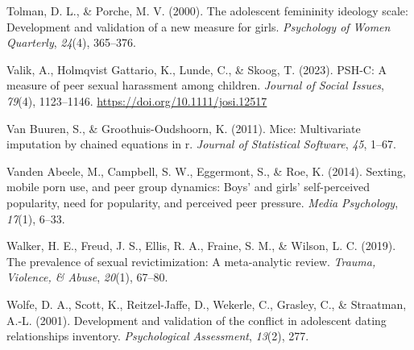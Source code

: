 \documentclass[
]{article}
\newlength{\cslhangindent}
\newenvironment{CSLReferences}[2] %
 {\begin{list}{}{%
  \setlength{\itemindent}{0pt}
  \setlength{\leftmargin}{0pt}
  \setlength{\parsep}{0pt}
  \ifodd #1
   \setlength{\leftmargin}{\cslhangindent}
   \setlength{\itemindent}{-1\cslhangindent}
  \fi
  \setlength{\itemsep}{#2\baselineskip}}}
 {\end{list}}
\begin{document}
\begin{CSLReferences}{1}{0}
Tolman, D. L., \& Porche, M. V. (2000). The adolescent femininity
ideology scale: Development and validation of a new measure for girls.
\emph{Psychology of Women Quarterly}, \emph{24}(4), 365--376.

Valik, A., Holmqvist Gattario, K., Lunde, C., \& Skoog, T. (2023).
PSH-C: A measure of peer sexual harassment among children. \emph{Journal
of Social Issues}, \emph{79}(4), 1123--1146.
\url{https://doi.org/10.1111/josi.12517}

Van Buuren, S., \& Groothuis-Oudshoorn, K. (2011). Mice: Multivariate
imputation by chained equations in r. \emph{Journal of Statistical
Software}, \emph{45}, 1--67.

Vanden Abeele, M., Campbell, S. W., Eggermont, S., \& Roe, K. (2014).
Sexting, mobile porn use, and peer group dynamics: Boys' and girls'
self-perceived popularity, need for popularity, and perceived peer
pressure. \emph{Media Psychology}, \emph{17}(1), 6--33.

Walker, H. E., Freud, J. S., Ellis, R. A., Fraine, S. M., \& Wilson, L.
C. (2019). The prevalence of sexual revictimization: A meta-analytic
review. \emph{Trauma, Violence, \& Abuse}, \emph{20}(1), 67--80.

Wolfe, D. A., Scott, K., Reitzel-Jaffe, D., Wekerle, C., Grasley, C., \&
Straatman, A.-L. (2001). Development and validation of the conflict in
adolescent dating relationships inventory. \emph{Psychological
Assessment}, \emph{13}(2), 277.

\end{CSLReferences}
\end{document}
